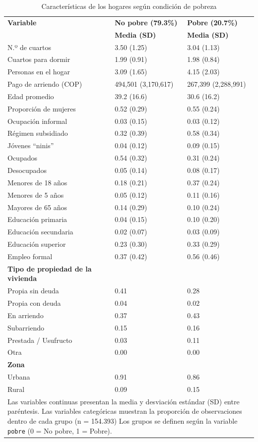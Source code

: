 \begin{table}[H]
\centering
\caption{Características de los hogares según condición de pobreza}
\scriptsize
\renewcommand{\arraystretch}{1.05}
\setlength{\tabcolsep}{4pt}
\begin{tabular}{p{5.2cm} p{3.3cm} p{3.3cm}}
\toprule
\textbf{Variable} & \textbf{No pobre (79.3\%)} & \textbf{Pobre (20.7\%)} \\
\textbf{}  & \textbf{Media (SD)} & \textbf{Media (SD)} \\
\midrule
N.º de cuartos & 3.50 (1.25) & 3.04 (1.13) \\
Cuartos para dormir & 1.99 (0.91) & 1.98 (0.84) \\
Personas en el hogar & 3.09 (1.65) & 4.15 (2.03) \\
Pago de arriendo (COP) & 494,501 (3,170,617) & 267,399 (2,288,991) \\
Edad promedio & 39.2 (16.6) & 30.6 (16.2) \\
Proporción de mujeres & 0.52 (0.29) & 0.55 (0.24) \\
Ocupación informal & 0.03 (0.15) & 0.03 (0.12) \\
Régimen subsidiado & 0.32 (0.39) & 0.58 (0.34) \\
Jóvenes “ninis” & 0.04 (0.12) & 0.09 (0.15) \\
Ocupados & 0.54 (0.32) & 0.31 (0.24) \\
Desocupados & 0.05 (0.14) & 0.08 (0.17) \\
Menores de 18 años & 0.18 (0.21) & 0.37 (0.24) \\
Menores de 5 años & 0.05 (0.12) & 0.11 (0.16) \\
Mayores de 65 años & 0.14 (0.29) & 0.10 (0.24) \\
Educación primaria & 0.04 (0.15) & 0.10 (0.20) \\
Educación secundaria & 0.02 (0.07) & 0.03 (0.09) \\
Educación superior & 0.23 (0.30) & 0.33 (0.29) \\
Empleo formal & 0.37 (0.42) & 0.56 (0.46) \\
\addlinespace
\textbf{Tipo de propiedad de la vivienda} & & \\
\quad Propia sin deuda & 0.41 & 0.28 \\
\quad Propia con deuda & 0.04 & 0.02 \\
\quad En arriendo & 0.37 & 0.43 \\
\quad Subarriendo & 0.15 & 0.16 \\
\quad Prestada / Usufructo & 0.03 & 0.11 \\
\quad Otra & 0.00 & 0.00 \\
\addlinespace
\textbf{Zona} & & \\
\quad Urbana & 0.91 & 0.86 \\
\quad Rural & 0.09 & 0.15 \\
\bottomrule
\multicolumn{3}{p{12.5cm}}{\footnotesize Las variables continuas presentan la media y desviación estándar (SD) entre paréntesis. Las variables categóricas muestran la proporción de observaciones dentro de cada grupo (n = 154.393) Los grupos se definen según la variable \texttt{pobre} (0 = No pobre, 1 = Pobre).}
\end{tabular}
\end{table}